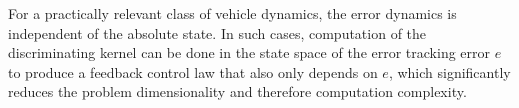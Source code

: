 For a practically relevant class of vehicle dynamics, the error dynamics is independent of the absolute state. In such cases, computation of the discriminating kernel can be done in the state space of the error tracking error $e$ to produce a feedback control law that also only depends on $e$, which significantly reduces the problem dimensionality and therefore computation complexity.


